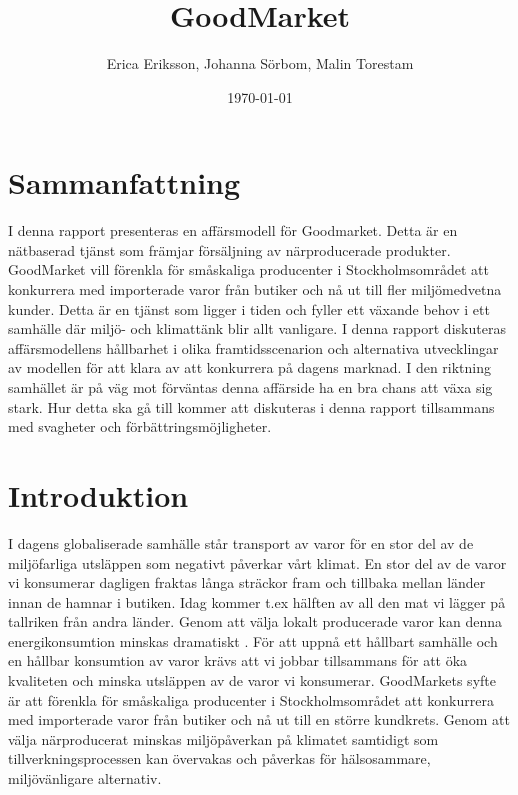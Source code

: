 \documentclass[10pt,a4paper,oneside]{article}
\title{GoodMarket}
\author{Erica Eriksson, Johanna Sörbom, Malin Torestam}
\date{\today}
\begin{document}
\maketitle
\newpage

\section{Sammanfattning}
I denna rapport presenteras en affärsmodell för Goodmarket. Detta är en nätbaserad tjänst som främjar försäljning av närproducerade produkter. GoodMarket vill förenkla för småskaliga producenter i Stockholmsområdet att konkurrera med importerade varor från butiker och nå ut till fler miljömedvetna kunder. Detta är en tjänst som ligger i tiden och fyller ett växande behov i ett samhälle där miljö- och klimattänk blir allt vanligare. I denna rapport diskuteras affärsmodellens hållbarhet i olika framtidsscenarion och alternativa utvecklingar av modellen för att klara av att konkurrera på dagens marknad. I den riktning samhället är på väg mot förväntas denna affärside ha en bra chans att växa sig stark. Hur detta ska gå till kommer att diskuteras i denna rapport tillsammans med svagheter och förbättringsmöjligheter. 
\newpage

\tableofcontents
\newpage

\section{Introduktion}
I dagens globaliserade samhälle står transport av varor för en stor del av de miljöfarliga utsläppen som negativt påverkar vårt klimat. En stor del av de varor vi konsumerar dagligen fraktas långa sträckor fram och tillbaka mellan länder innan de hamnar i butiken. Idag kommer t.ex hälften av all den mat vi lägger på tallriken från andra länder. Genom att välja lokalt producerade varor kan denna energikonsumtion minskas dramatiskt \cite{Naturskyddsföreningen2}. För att uppnå ett hållbart samhälle och en hållbar konsumtion av varor krävs att vi jobbar tillsammans för att öka kvaliteten och minska utsläppen av de varor vi konsumerar. GoodMarkets syfte är att förenkla för småskaliga producenter i Stockholmsområdet att konkurrera med importerade varor från butiker och nå ut till en större kundkrets. Genom att välja närproducerat minskas miljöpåverkan på klimatet samtidigt som tillverkningsprocessen kan övervakas och påverkas för hälsosammare, miljövänligare alternativ. 

\newpage
\end{document}

